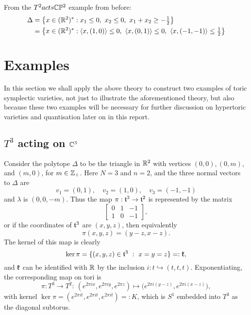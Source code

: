 \begin{ex}
	From the $T^{2} acts \mathbb{C}\mathbb{P}^{2}$ example from before:
	\begin{equation*}
	\begin{split}
	\Delta &= \big\{ x\in (\mathbb{R}^{2})^{\ast} : x_{1} \leq 0,\ x_{2} \leq 0,\ x_{1} + x_{2} \geq -\tfrac{1}{2} \big\}\\
	&= \big\{ x\in (\mathbb{R}^{2})^{\ast} : \langle x,(1,0)\rangle \leq 0,\ \langle x,(0,1)\rangle \leq 0,\ \langle x, (-1,-1) \rangle \leq \tfrac{1}{2} \big\}
	\end{split}
	\end{equation*}
	
\end{ex}

\section{Examples}

In this section we shall apply the above theory to construct two examples of toric symplectic varieties, not just to illustrate the aforementioned theory, but also because these two examples will be necessary for further discussion on hypertoric varieties and quantisation later on in this report.

\subsection{$T^{3}$ acting on $\mathbb{C}^{3}$}

Consider the polytope $\Delta$ to be the triangle in $\mathbb{R}^{2}$ with vertices $(0,0), (0,m)$, and $(m,0)$, for $m \in \mathbb{Z}_{+}$. Here $N = 3$ and $n=2$, and the three normal vectors to $\Delta$ are
\begin{equation*}
	v_{1} = (0,1),\quad v_{2} = (1,0),\quad v_{3} = (-1,-1)
\end{equation*}
and $\lambda$ is $(0,0,-m)$. Thus the map $\pi: \mathfrak{t}^{3} \rightarrow \mathfrak{t}^{2}$ is represented by the matrix
\begin{equation*}
	\begin{bmatrix}
	0 & 1 & -1 \\
	1 & 0 & -1
	\end{bmatrix},
\end{equation*}
or if the coordinates of $\mathfrak{t}^{3}$ are $(x,y,z)$, then equivalently
\begin{equation*}
	\pi(x,y,z) = (y-z,x-z).
\end{equation*}
The kernel of this map is clearly
\begin{equation*}
	\ker \pi = \{ (x,y,z) \in \mathfrak{t}^{3}\ :\ x = y = z \} =: \mathfrak{k},
\end{equation*}
and $\mathfrak{k}$ can be identified with $\mathbb{R}$ by the inclusion $i:t \hookrightarrow (t,t,t)$. Exponentiating, the corresponding map on tori is
\begin{equation*}
	\pi: T^{3} \rightarrow T^{2}:\ (e^{2\pi i x}, e^{2\pi i y}, e^{2\pi z} ) \mapsto \big( e^{2\pi i (y-z)}, e^{2\pi i (x-z)}\big),
\end{equation*}
with kernel $\ker\pi = (e^{2\pi i t}, e^{2\pi i t}, e^{2\pi i t}) =: K$, which is $S^{1}$ embedded into $T^{3}$ as the diagonal subtorus.

